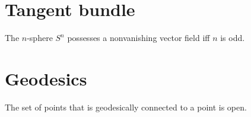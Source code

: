 \documentclass{../exp}
\begin{document}
\section{Tangent bundle}


\begin{prop}
The $n$-sphere $S^n$ possesses a nonvanishing vector field iff $n$ is odd.
\end{prop}


\section{Geodesics}

\begin{prop}
The set of points that is geodesically connected to a point is open.
\end{prop}
\end{document}
